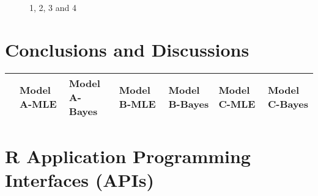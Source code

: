 \begin{figure}[H]
	\centering
	\begin{minipage}[b]{0.5\linewidth}
	\end{minipage}\hfill
	\begin{minipage}[b]{0.5\linewidth}
	\end{minipage}\hfill	
	\begin{minipage}[b]{0.5\linewidth}
	\end{minipage}\hfill
	\begin{minipage}[b]{0.5\linewidth}
	\end{minipage}\hfill
	\caption{1, 2, 3 and 4}
	\label{fig:Figure1}
\end{figure} 


\section{Conclusions and Discussions}

\begin{table}[H]
	\centering
	\begin{tabular}{rp{1cm}p{1cm}p{1cm}p{1cm}p{1cm}p{1cm}}
		\hline
		& Model A-MLE & Model A-Bayes & Model B-MLE & Model B-Bayes & Model C-MLE & Model C-Bayes \\ 
		\hline
		\hline
	\end{tabular}
\end{table}


\section{R Application Programming Interfaces (APIs)}


